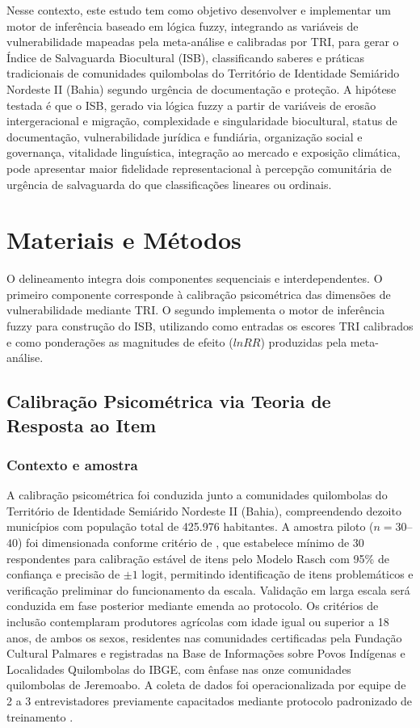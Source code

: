 \documentclass[pdflatex,sn-basic]{sn-jnl}%
\theoremstyle{thmstyleone}%
\theoremstyle{thmstyletwo}%
\theoremstyle{thmstylethree}%
\begin{document}
Nesse contexto, este estudo tem como objetivo desenvolver e implementar um motor de inferência baseado em lógica fuzzy, integrando as variáveis de vulnerabilidade mapeadas pela meta-análise e calibradas por TRI, para gerar o Índice de Salvaguarda Biocultural (ISB), classificando saberes e práticas tradicionais de comunidades quilombolas do Território de Identidade Semiárido Nordeste II (Bahia) segundo urgência de documentação e proteção. A hipótese testada é que o ISB, gerado via lógica fuzzy a partir de variáveis de erosão intergeracional e migração, complexidade e singularidade biocultural, status de documentação, vulnerabilidade jurídica e fundiária, organização social e governança, vitalidade linguística, integração ao mercado e exposição climática, pode apresentar maior fidelidade representacional à percepção comunitária de urgência de salvaguarda do que classificações lineares ou ordinais.


\section{Materiais e Métodos}\label{sec:metodos}

O delineamento integra dois componentes sequenciais e interdependentes. O primeiro componente corresponde à calibração psicométrica das dimensões de vulnerabilidade mediante TRI. O segundo implementa o motor de inferência fuzzy para construção do ISB, utilizando como entradas os escores TRI calibrados e como ponderações as magnitudes de efeito ($lnRR$) produzidas pela meta-análise.


\subsection{Calibração Psicométrica via Teoria de Resposta ao Item}\label{subsec:tri}

\subsubsection{Contexto e amostra}\label{subsubsec:amostra}

A calibração psicométrica foi conduzida junto a comunidades quilombolas do Território de Identidade Semiárido Nordeste II (Bahia), compreendendo dezoito municípios com população total de 425.976 habitantes. A amostra piloto ($n = 30$--$40$) foi dimensionada conforme critério de \citet{Linacre1994}, que estabelece mínimo de 30 respondentes para calibração estável de itens pelo Modelo Rasch com 95\% de confiança e precisão de $\pm 1$ logit, permitindo identificação de itens problemáticos e verificação preliminar do funcionamento da escala. Validação em larga escala será conduzida em fase posterior mediante emenda ao protocolo. Os critérios de inclusão contemplaram produtores agrícolas com idade igual ou superior a 18 anos, de ambos os sexos, residentes nas comunidades certificadas pela Fundação Cultural Palmares e registradas na Base de Informações sobre Povos Indígenas e Localidades Quilombolas do IBGE, com ênfase nas onze comunidades quilombolas de Jeremoabo. A coleta de dados foi operacionalizada por equipe de 2 a 3 entrevistadores previamente capacitados mediante protocolo padronizado de treinamento \citep{Fowler2014}.
\end{document}
